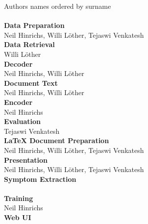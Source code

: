 
Authors names ordered by surname\\
\\
\textbf{Data Preparation}\\
Neil Hinrichs, Willi Löther, Tejaswi Venkatesh
\\
\textbf{Data Retrieval}\\
Willi Löther
\\
\textbf{Decoder}\\
Neil Hinrichs, Willi Löther
\\
\textbf{Document Text}\\
Neil Hinrichs, Willi Löther
\\
\textbf{Encoder}\\
Neil Hinrichs
\\
\textbf{Evaluation}\\
Tejaswi Venkatesh
\\
\textbf{LaTeX Document Preparation}\\
Neil Hinrichs, Willi Löther, Tejaswi Venkatesh
\\
\textbf{Presentation}\\
Neil Hinrichs, Willi Löther, Tejaswi Venkatesh
\\
\textbf{Symptom Extraction}\\
\\
\textbf{Training}\\
Neil Hinrichs
\\
\textbf{Web UI}\\

\\